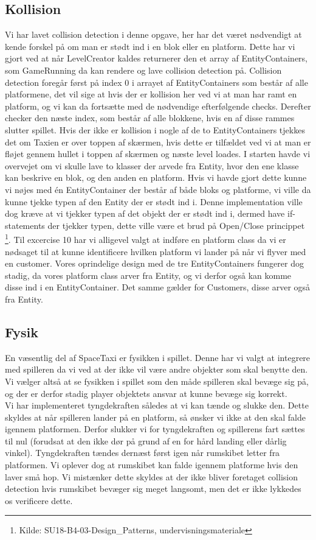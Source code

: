 \subsection{Kollision}
Vi har lavet collision detection i denne opgave, her har det været nødvendigt at kende forskel på om man er stødt ind i en blok eller en platform. Dette har vi gjort ved at når LevelCreator kaldes returnerer den et array af EntityContainers, som GameRunning da kan rendere og lave collision detection på. Collision detection foregår først på index 0 i arrayet af EntityContainers som består af alle platformene, det vil sige at hvis der er kollision her ved vi at man har ramt en platform, og vi kan da fortsætte med de nødvendige efterfølgende checks. Derefter checker den næste index, som består af alle blokkene, hvis en af disse rammes slutter spillet. Hvis der ikke er kollision i nogle af de to EntityContainers tjekkes det om Taxien er over toppen af skærmen, hvis dette er tilfældet ved vi at man er fløjet gennem hullet i toppen af skærmen og næste level loades. I starten havde vi overvejet om vi skulle lave to klasser der arvede fra Entity, hvor den ene klasse kan beskrive en blok, og den anden en platform. Hvis vi havde gjort dette kunne vi nøjes med én EntityContainer der består af både bloks og platforme, vi ville da kunne tjekke typen af den Entity der er stødt ind i. Denne implementation ville dog kræve at vi tjekker typen af det objekt der er stødt ind i, dermed have if-statements der tjekker typen, dette ville være et brud på Open/Close princippet \footnote{Kilde: SU18-B4-03-Design\_Patterns, undervisningsmateriale}. Til excercise 10 har vi alligevel valgt at indføre en platform class da vi er nødsaget til at kunne identificere hvilken platform vi lander på når vi flyver med en customer. Vores oprindelige design med de tre EntityContainers fungerer dog stadig, da vores platform class arver fra Entity, og vi derfor også kan komme disse ind i en EntityContainer. Det samme gælder for Customers, disse arver også fra Entity.\\

\subsection{Fysik}
   En væsentlig del af SpaceTaxi er fysikken i spillet. Denne har vi valgt at integrere med spilleren da vi ved at der ikke vil være andre objekter som skal benytte den. Vi vælger altså at se fysikken i spillet som den måde spilleren skal bevæge sig på, og der er derfor stadig player objektets ansvar at kunne bevæge sig korrekt.\\
   Vi har implementeret tyngdekraften således at vi kan tænde og slukke den. Dette skyldes at når spilleren lander på en platform, så ønsker vi ikke at den skal falde igennem platformen. Derfor slukker vi for tyngdekraften og spillerens fart sættes til nul (forudsat at den ikke dør på grund af en for hård landing eller dårlig vinkel). Tyngdekraften tændes dernæst først igen når rumskibet letter fra platformen. Vi oplever dog at rumskibet kan falde igennem platforme hvis den laver små hop. Vi mistænker dette skyldes at der ikke bliver foretaget collision detection hvis rumskibet bevæger sig meget langsomt, men det er ikke lykkedes os verificere dette.

